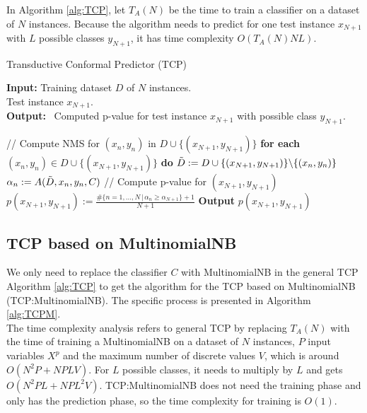 \documentclass[10pt]{reportMaster}
\begin{document}
\noindent In Algorithm \ref{alg:TCP}, let $T_A(N)$ be the time to train a classifier on a dataset of $N$ instances. Because the algorithm needs to predict for one test instance $x_{N+1}$ with $L$ possible classes $y_{N+1}$, it has time complexity $O(T_A(N)NL)$.

\begin{algorithm}[H]
\caption{Transductive Conformal Predictor (TCP)}\label{alg:TCP}
\textbf{Input:} \; \; Training dataset $D$ of $N$ instances.\\
\hspace*{\algorithmicindent} \quad \quad \; \; Test instance $x_{N+1}$.\\
\textbf{Output:} \, Computed p-value for test instance $x_{N+1}$ with possible class $y_{N+1}$.
\begin{algorithmic}[1]
\State // Compute NMS for $ (x_n, y_n)$ in $D \cup \{(x_{N+1},y_{N+1})\}$
\State \textbf{for each} $(x_n,y_n) \in D \cup \{(x_{N+1},y_{N+1})\}$ \textbf{do}
\State \qquad $\Tilde{D}:= D \cup \{(x_{N+1},y_{N+1})\} \backslash \{(x_n,y_n)\}$
\State $\qquad$ $\alpha_n := A(\Tilde{D},x_n,y_n,C)$
\State // Compute p-value for $(x_{N+1},y_{N+1})$
\State $p(x_{N+1},y_{N+1}):=\frac{\#\{n=1,...,N \,|\, \alpha_n \geq \alpha_{N+1}\}+1}{N+1}$
\State \textbf{Output} $p(x_{N+1},y_{N+1})$
\end{algorithmic}
\end{algorithm}

\subsection{TCP based on MultinomialNB}

We only need to replace the classifier $C$ with MultinomialNB in the general TCP Algorithm \ref{alg:TCP} to get the algorithm for the TCP based on MultinomialNB (TCP:MultinomialNB). The specific process is presented in Algorithm \ref{alg:TCPM}. \\

\noindent The time complexity analysis refers to general TCP by replacing $T_A(N)$ with the time of training a MultinomialNB on a dataset of $N$ instances, $P$ input variables $X^p$ and the maximum number of discrete values $V$, which is around $O(N^2P+NPLV)$. For $L$ possible classes, it needs to multiply by $L$ and gets $O(N^2PL+NPL^2V)$. TCP:MultinomialNB does not need the training phase and only has the prediction phase, so the time complexity for training is $O(1)$.
\end{document}
